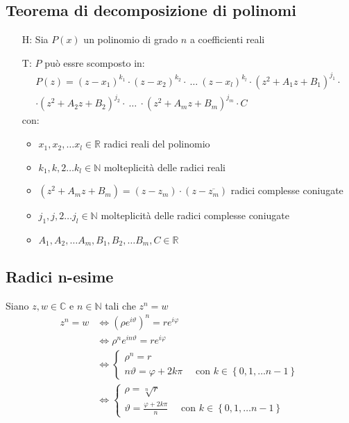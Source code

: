 \documentclass[a4paper]{article}
\begin{document}
\subsection{Teorema di decomposizione di polinomi}
\begin{itemize}
	\item[H: ] Sia \(P(x)\) un polinomio di grado \(n\) a coefficienti reali
	\item[T: ] \(P\) può essre scomposto in:
	\begin{multline*}
		P(z) = \left( z - x_1 \right) ^ {k_1} \cdot \left( z - x_2 \right) ^ {k_2} \cdot \  \dots \  \left( z - x_l \right) ^ {k_l} \cdot \left( z^2 + A_1 z + B_1 \right) ^ {j_1} \cdot \\
		\cdot \left( z^2 + A_2 z + B_2 \right) ^ {j_2} \cdot \  \dots \  \cdot \left( z^2 + A_m z + B_m \right) ^ {j_m} \cdot  C
	\end{multline*}
	con:
	\begin{itemize}
		\item \(x_1, x_2, \dots x_l \in \mathbb{R}\) radici reali del polinomio
		\item \(k_1, k,2 \dots k_l \in \mathbb{N}\) molteplicità delle radici reali
		\item \(\left( z^2 + A_m z + B_m \right) = \left( z - z_m \right) \cdot \left( z - \overline{z_m} \right)\) radici complesse coniugate
		\item \(j_1, j,2 \dots j_l \in \mathbb{N}\) molteplicità delle radici complesse coniugate
		\item \(A_1, A_2, \dots A_m, B_1, B_2, \dots B_m, C \in \mathbb{R}\)
	\end{itemize}
\end{itemize}

\subsection{Radici n-esime}
Siano \(z, w \in \mathbb{C}\) e \(n \in \mathbb{N}\) tali che \(z ^ n = w\)
\begin{align*}
	z ^ n = w &\Leftrightarrow \left( \rho e ^ {i \vartheta} \right) ^ n = r e ^ {i \varphi} \\
	&\Leftrightarrow \rho ^ n e ^ {i n \vartheta} = r e ^ {i \varphi} \\
	&\Leftrightarrow
	\begin{cases}
		\rho ^ n = r \\
		n \vartheta = \varphi + 2 k \pi \quad \text{ con } k \in \left\{ 0, 1, \dots n-1 \right\}
	\end{cases} \\
	&\Leftrightarrow
	\begin{cases}
		\rho = \sqrt[n]{r} \\
		\vartheta = \frac{\varphi + 2k\pi}{n} \quad \text{ con } k \in \left\{ 0, 1, \dots n-1 \right\}
	\end{cases}
\end{align*}
\end{document}
